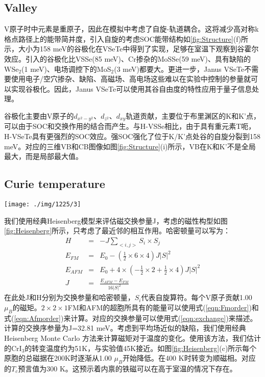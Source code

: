 \documentclass[reprint, aps, prb, showkeys]{revtex4-2}
\begin{document}
\subsection{Valley}
V原子时中元素是重原子，因此在模拟中考虑了自旋-轨道耦合。这将减少高对称k格点路径上的能带简并度，引入自旋的考虑SOC能带结构如\ref{fig:Structure}(f)所示，大小为158 meV的谷极化在VSeTe中得到了实现，足够在室温下观察到谷霍尔效应。引入的谷极化比VSSe(85 meV)、Cr掺杂的MoSSe(59 meV)、具有缺陷的WSe$_2$(1 meV)、电场调控下的MoS$_2$(3 meV)都要大。更进一步，Janus VSeTe不需要使用电子/空穴掺杂、缺陷、高磁场、高电场这些难以在实验中控制的参量就可以实现谷极化。因此，Janus VSeTe可以使用其谷自由度的特性应用于量子信息处理。

谷极化主要由V原子的$d_{x^2 - y^2}$、$d_{z^2}$、$d_{xy}$轨道贡献，主要位于布里渊区的K和K'点，可以由于SOC和交换作用的结合而产生。与H-VSSe相比，由于具有重元素T呃，H-VSeTe具有更强烈的SOC效应。强SOC强化了位于K/K'点处谷的自旋分裂到158 meV。对应的三维VB和CB图像如图\ref{fig:Structure}(i)所示，VB在K和K'不是全局最大，而是局部最大值。

\subsection{Curie temperature}
\begin{figure*}[b]
    \texttt{[image: ./img/1225/3]}
    \caption{\label{fig:Heisenberg}
    (a-b)考虑最近邻交换作用的Heisenberg模型，红色和蓝色箭头表示了V原子与最近邻V原子的铁磁耦合和反铁磁耦合；(c)使用经典Heisenberg模型的MD给出的每个原胞的磁矩/热容随温度的变化关系。
    }
\end{figure*}
我们使用经典Heisenberg模型来评估磁交换参量J，考虑的磁性构型如图\ref{fig:Heisenberg}所示，只考虑了最近邻的相互作用。哈密顿量可以写为：
\begin{eqnarray}
    H &=& -J \sum_{<i, j>} S_i \times S_j \label{eqn:Heisenberg}\\
    E_{FM} &=& E_0 - (\frac{1}{2} \times 6 \times 4)J |S|^2 \label{eqn:Fmorder}\\
    E_{AFM} &=& E_0 + 4 \times ( - \frac{1}{2} \times 2 + \frac{1}{2} \times 4) J |S|^2 \label{eqn:Afmorder}\\
    J &=& \frac{E_{AFM} - E_{FM}}{16 |S|^2} \label{eqn:exchange}
\end{eqnarray}
在此处J和H分别为交换参量和哈密顿量，$S_i$代表自旋算符。每个V原子贡献1.00 $\mu_B$的磁矩。$2 \times 2 \times 1$FM和AFM的超胞所具有的能量可以使用式(\ref{eqn:Fmorder})和式(\ref{eqn:Afmorder})来计算。对应的交换参量可以使用式(\ref{eqn:exchange})来描述。计算的交换序参量为J=32.81 meV。考虑到平均场近似的缺陷，我们使用经典Heisenberg Monte Carlo 方法来计算磁矩对于温度的变化。使用该方法，我们估计的CrI$_3$的转变温度约为51K，与实验值45K接近。如图\ref{fig:Heisenberg}(c)所示每个原胞的总磁据在200K时逐渐从1.00 $\mu_B$开始降低。在400 K时转变为顺磁相。对应的$T_c$预言值为300 K。这预示着内禀的铁磁可以在高于室温的情况下存在。
\end{document}

